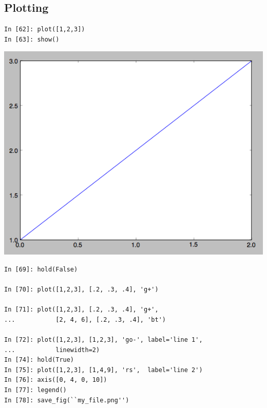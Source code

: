 \subsection{Plotting}

\begin{frame}[fragile]
\begin{block}{}
\begin{verbatim}
In [62]: plot([1,2,3])
In [63]: show()
\end{verbatim}
\end{block}
\begin{center}
\includegraphics[scale=.35]{../figures/matplotlib/plot_basic.png}
\end{center}
\end{frame}

\begin{frame}[fragile]
\begin{block}{}
\begin{verbatim}
In [69]: hold(False)

In [70]: plot([1,2,3], [.2, .3, .4], 'g+')

In [71]: plot([1,2,3], [.2, .3, .4], 'g+',
...           [2, 4, 6], [.2, .3, .4], 'bt')

In [72]: plot([1,2,3], [1,2,3], 'go-', label='line 1',
...           linewidth=2)
In [74]: hold(True)
In [75]: plot([1,2,3], [1,4,9], 'rs',  label='line 2')
In [76]: axis([0, 4, 0, 10])
In [77]: legend()
In [78]: save_fig(``my_file.png'')
\end{verbatim}
\end{block}
\end{frame}

